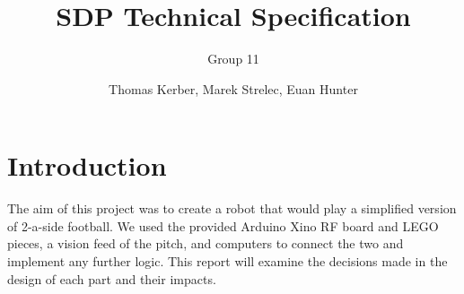 \documentclass[a4paper,12pt]{scrartcl}
\author{Thomas Kerber, Marek Strelec, Euan Hunter}
\title{SDP Technical Specification}
\subtitle{Group 11}
\begin{document}
\maketitle

\section{Introduction}

The aim of this project was to create a robot that would play a simplified
version of 2-a-side football. We used the provided Arduino Xino RF board and
LEGO pieces, a vision feed of the pitch, and computers to connect the two and
implement any further logic. This report will examine the decisions made in the
design of each part and their impacts.







\pagebreak


\pagebreak
\appendix





\end{document}
